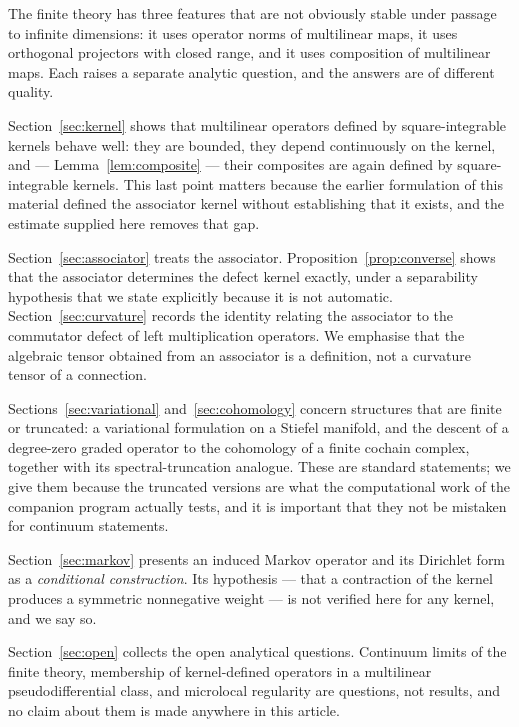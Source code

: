 \documentclass[11pt]{amsart}
\theoremstyle{definition}
\theoremstyle{remark}
\begin{document}
The finite theory has three features that are not obviously stable under passage to
infinite dimensions: it uses operator norms of multilinear maps, it uses orthogonal
projectors with closed range, and it uses composition of multilinear maps. Each raises a
separate analytic question, and the answers are of different quality.

Section~\ref{sec:kernel} shows that multilinear operators defined by square-integrable
kernels behave well: they are bounded, they depend continuously on the kernel, and ---
Lemma~\ref{lem:composite} --- their composites are again defined by square-integrable
kernels. This last point matters because the earlier formulation of this material defined
the associator kernel without establishing that it exists, and the estimate supplied here
removes that gap.

Section~\ref{sec:associator} treats the associator. Proposition~\ref{prop:converse} shows
that the associator determines the defect kernel exactly, under a separability hypothesis
that we state explicitly because it is not automatic. Section~\ref{sec:curvature} records
the identity relating the associator to the commutator defect of left multiplication
operators. We emphasise that the algebraic tensor obtained from an associator is a
definition, not a curvature tensor of a connection.

Sections~\ref{sec:variational} and~\ref{sec:cohomology} concern structures that are
finite or truncated: a variational formulation on a Stiefel manifold, and the descent of a
degree-zero graded operator to the cohomology of a finite cochain complex, together with
its spectral-truncation analogue. These are standard statements; we give them because the
truncated versions are what the computational work of the companion program actually
tests, and it is important that they not be mistaken for continuum statements.

Section~\ref{sec:markov} presents an induced Markov operator and its Dirichlet form as a
\emph{conditional construction}. Its hypothesis --- that a contraction of the kernel
produces a symmetric nonnegative weight --- is not verified here for any kernel, and we
say so.

Section~\ref{sec:open} collects the open analytical questions. Continuum limits of the
finite theory, membership of kernel-defined operators in a multilinear pseudodifferential
class, and microlocal regularity are questions, not results, and no claim about them is
made anywhere in this article.
\end{document}
